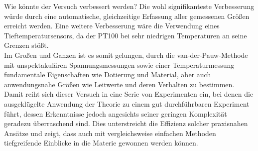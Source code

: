 Wie könnte der Versuch verbessert werden? Die wohl signifikanteste Verbesserung würde durch eine automatische, gleichzeitige Erfassung aller gemessenen Größen erreicht werden. Eine weitere Verbesserung wäre die Verwendung eines Tieftemperatursensors, da der PT100 bei sehr niedrigen Temperaturen an seine Grenzen stößt.
\\



Im Großen und Ganzen ist es somit gelungen, durch die van-der-Pauw-Methode mit unspektakulären Spannungsmessungen sowie einer Temperaturmessung fundamentale Eigenschaften wie Dotierung und Material, aber auch anwendungsnahe Größen wie Leitwerte und deren Verhalten zu bestimmen. Damit reiht sich dieser Versuch in eine Serie von Experimenten ein, bei denen die ausgeklügelte Anwendung der Theorie zu einem gut durchführbaren Experiment führt, dessen Erkenntnisse jedoch angesichts seiner geringen Komplexität geradezu überraschend sind. Dies unterstreicht die Effizienz solcher praxisnahen Ansätze und zeigt, dass auch mit vergleichsweise einfachen Methoden tiefgreifende Einblicke in die Materie gewonnen werden können.
